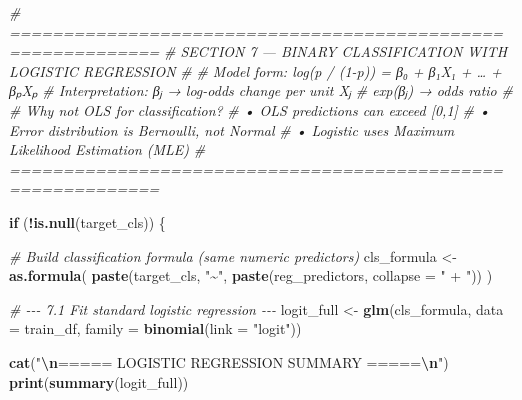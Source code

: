 \documentclass[
]{article}
\newenvironment{Shaded}{\begin{snugshade}}{\end{snugshade}}
\newcommand{\AttributeTok}[1]{\textcolor[rgb]{0.13,0.29,0.53}{#1}}
\newcommand{\CommentTok}[1]{\textcolor[rgb]{0.56,0.35,0.01}{\textit{#1}}}
\newcommand{\ControlFlowTok}[1]{\textcolor[rgb]{0.13,0.29,0.53}{\textbf{#1}}}
\newcommand{\FunctionTok}[1]{\textcolor[rgb]{0.13,0.29,0.53}{\textbf{#1}}}
\newcommand{\NormalTok}[1]{#1}
\newcommand{\OtherTok}[1]{\textcolor[rgb]{0.56,0.35,0.01}{#1}}
\newcommand{\SpecialCharTok}[1]{\textcolor[rgb]{0.81,0.36,0.00}{\textbf{#1}}}
\newcommand{\StringTok}[1]{\textcolor[rgb]{0.31,0.60,0.02}{#1}}
\begin{document}
\begin{Shaded}
\begin{Highlighting}[]
\CommentTok{\# ============================================================}
\CommentTok{\#  SECTION 7 — BINARY CLASSIFICATION WITH LOGISTIC REGRESSION}
\CommentTok{\#}
\CommentTok{\#  Model form:  log(p / (1{-}p)) = β₀ + β₁X₁ + … + βₚXₚ}
\CommentTok{\#  Interpretation: βⱼ → log{-}odds change per unit Xⱼ}
\CommentTok{\#                  exp(βⱼ) → odds ratio}
\CommentTok{\#}
\CommentTok{\#  Why not OLS for classification?}
\CommentTok{\#    • OLS predictions can exceed [0,1]}
\CommentTok{\#    • Error distribution is Bernoulli, not Normal}
\CommentTok{\#    • Logistic uses Maximum Likelihood Estimation (MLE)}
\CommentTok{\# ============================================================}

\ControlFlowTok{if}\NormalTok{ (}\SpecialCharTok{!}\FunctionTok{is.null}\NormalTok{(target\_cls)) \{}

  \CommentTok{\# Build classification formula (same numeric predictors)}
\NormalTok{  cls\_formula }\OtherTok{\textless{}{-}} \FunctionTok{as.formula}\NormalTok{(}
    \FunctionTok{paste}\NormalTok{(target\_cls, }\StringTok{"\textasciitilde{}"}\NormalTok{, }\FunctionTok{paste}\NormalTok{(reg\_predictors, }\AttributeTok{collapse =} \StringTok{" + "}\NormalTok{))}
\NormalTok{  )}

  \CommentTok{\# {-}{-}{-} 7.1  Fit standard logistic regression {-}{-}{-}}
\NormalTok{  logit\_full }\OtherTok{\textless{}{-}} \FunctionTok{glm}\NormalTok{(cls\_formula, }\AttributeTok{data =}\NormalTok{ train\_df, }\AttributeTok{family =} \FunctionTok{binomial}\NormalTok{(}\AttributeTok{link =} \StringTok{"logit"}\NormalTok{))}

  \FunctionTok{cat}\NormalTok{(}\StringTok{"}\SpecialCharTok{\textbackslash{}n}\StringTok{===== LOGISTIC REGRESSION SUMMARY =====}\SpecialCharTok{\textbackslash{}n}\StringTok{"}\NormalTok{)}
  \FunctionTok{print}\NormalTok{(}\FunctionTok{summary}\NormalTok{(logit\_full))}


\end{Highlighting}
\end{Shaded}
\end{document}
